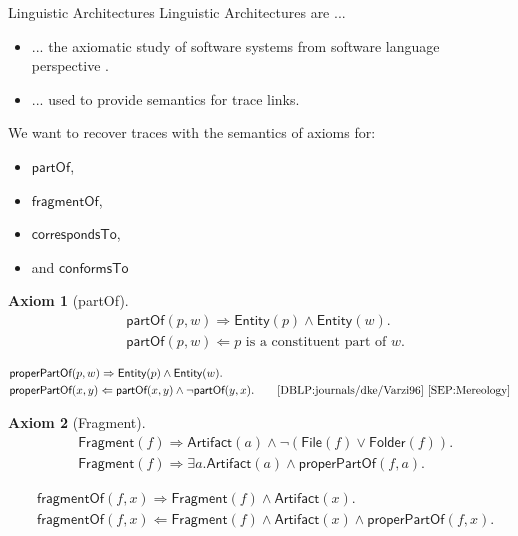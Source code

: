 \documentclass{beamer}
\newtheorem{axiom}{Axiom}
\newcommand{\Entity}{\textsf{Entity}}
\newcommand{\Artifact}{\textsf{Artifact}}
\newcommand{\File}{\textsf{File}}
\newcommand{\Folder}{\textsf{Folder}}
\newcommand{\Fragment}{\textsf{Fragment}}
\newcommand{\partOf}{\textsf{partOf}}
\newcommand{\properPartOf}{\textsf{properPartOf}}
\newcommand{\fragmentOf}{\textsf{fragmentOf}}
\newcommand{\correspondsTo}{\textsf{correspondsTo}}
\newcommand{\conformsTo}{\textsf{conformsTo}}
\begin{document}
\begin{frame}{Linguistic Architectures}
Linguistic Architectures are ...
\begin{itemize}
\item
... the axiomatic study of software systems from software language perspective
\cite{DBLP:conf/modelsward/HeinzLV17}
\cite{DBLP:conf/sle/Lammel16}
\cite{DBLP:conf/ecmdafa/LammelV14}
\cite{DBLP:conf/models/FavreLV12}.

\item
... used to provide semantics for trace links.
\end{itemize}
We want to recover traces with the semantics of axioms for:
\begin{itemize}
\item
$\partOf$,
\item
$\fragmentOf$,
\item
$\correspondsTo$,
\item
and $\conformsTo$ 
\end{itemize}
\pagebreak
\begin{axiom}[partOf]
\begin{align*}
&\partOf(p,w)
\Rightarrow
\Entity(p) \wedge \Entity(w).\\
&\partOf(p,w)
\Leftarrow
p \text{ is a constituent part of } w.
\end{align*}
\end{axiom}

\begin{definition}[porperPartOf]
\begin{align*}
&\properPartOf(p,w)
\Rightarrow
\Entity(p) \wedge \Entity(w).\\
&\properPartOf(x,y)
\Leftarrow
\partOf(x,y) \wedge \neg \partOf(y,x).
\qquad\text{\cite{DBLP:journals/dke/Varzi96} \cite{SEP:Mereology}}
\end{align*}
\end{definition}
\pagebreak
\begin{axiom}[Fragment]
\begin{align*}
&\Fragment(f) 
\Rightarrow
\Artifact(a) \wedge \neg(\File(f) \vee \Folder(f)).\\
&\Fragment(f) 
\Rightarrow 
\exists a.\Artifact(a) \wedge \properPartOf(f,a).
\end{align*}
\end{axiom}

\begin{definition}[fragmentOf]
\begin{align*}
&\fragmentOf(f,x) 
\Rightarrow
\Fragment(f) \wedge \Artifact(x).\\
&\fragmentOf(f,x) 
\Leftarrow
\Fragment(f) \wedge \Artifact(x) \wedge \properPartOf(f,x).
\end{align*}
\end{definition}


\end{frame}
\end{document}
